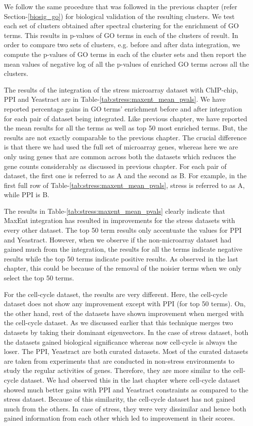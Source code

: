 We follow the same procedure that was followed in the previous chapter (refer Section-\ref{biosig_go}) for biological validation of the resulting clusters. We test each set of clusters obtained after spectral clustering for the enrichment of GO terms. This results in p-values of GO terms in each of the clusters of result. In order to compare two sets of clusters, e.g. before and after data integration, we compute the p-values of GO terms in each of the cluster sets and then report the mean values of negative log of all the p-values of enriched GO terms across all the clusters.

The results of the integration of the stress microarray dataset with ChIP-chip, PPI and Yeastract are in Table-\ref{tab:stress:maxent_mean_pvals}. We have reported percentage 
gains in GO terms' enrichment before and after integration for each pair of dataset being integrated. Like previous chapter, we have reported the mean results for 
all the terms as well as top 50 most enriched terms. But, the results are not exactly comparable to the previous chapter. The crucial difference is that there we had used the 
full set of microarray genes, whereas here we are only using genes that are common across both the datasets which reduces the gene counts considerably as discussed in 
previous chapter. For each pair of dataset, the first one is referred to as A and the second as B. For example, in the first full 
row of Table-\ref{tab:stress:maxent_mean_pvals}, stress is referred to as A, while PPI is B. 

The results in Table-\ref{tab:stress:maxent_mean_pvals} clearly indicate that MaxEnt integration has resulted in improvements for the stress datasets with every 
other dataset. The top 50 term results only accentuate the values for PPI and Yeastract. However, when we observe if the non-microarray 
dataset had gained much from the integration, the results for all the terms indicate negative results while the top 50 terms indicate positive results. 
As observed in the last chapter, this could be because of the removal of the noisier terms when we only select the top 50 terms.

For the cell-cycle dataset, the results are very different. Here, the cell-cycle dataset does not show any improvement except with PPI (for top 50 terms). On, the other hand, 
rest of the datasets have shown improvement when merged with the cell-cycle dataset. As we discussed earlier that this technique merges two datasets by taking their 
dominant eigenvectors. In the case of stress dataset, both the datasets gained biological significance whereas now cell-cycle is always the loser. The PPI, Yeastract 
are both curated datasets. Most of the curated datasets are taken from experiments that are conducted in non-stress environments to study the regular activities of genes. 
Therefore, they are more similar to the cell-cycle dataset. We had observed this in the last chapter where cell-cycle dataset showed much better gains with 
PPI and Yeastract constraints as compared to the stress dataset. Because of this similarity, the cell-cycle dataset has not gained much from the others. 
In case of stress, they were very dissimilar and hence both gained information from each other which led to improvement in their scores.    


